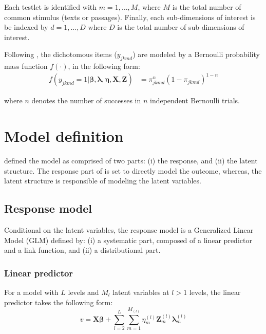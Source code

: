 Each testlet is identified with $m=1, \dots, M$, where $M$ is the total number of common stimulus (texts or passages). Finally, each sub-dimensions of interest is be indexed by $d=1, \dots, D$ where $D$ is the total number of sub-dimensions of interest. 

Following \citet{Rabe_et_al_2004a, Rabe_et_al_2004b}, the dichotomous items ($y_{jkmd}$) are modeled by a Bernoulli probability mass function $f(\cdot)$, in the following form:
\begin{equation} \label{eq:outcome}
	\begin{split}
		f \left( y_{jkmd}=1 | \pmb{\beta}, \pmb{\lambda}, \pmb{\eta}, \mathbf{X}, \mathbf{Z} \right) &= \pi_{jkmd}^{n} (1-\pi_{jkmd})^{1-n}
	\end{split}
\end{equation}

\noindent where $n$ denotes the number of successes in $n$ independent Bernoulli trials.

\section{Model definition} \label{sect:definition}

defined the model as comprised of two parts: (i) the response, and (ii) the latent structure. The response part of is set to directly model the outcome, whereas, the latent structure is responsible of modeling the latent variables.




\subsection{Response model} \label{s_sect:response}

Conditional on the latent variables, the response model is a Generalized Linear Model (GLM) \cite{Nelder_et_al_1989} defined by: (i) a systematic part, composed of a linear predictor and a link function, and (ii) a distributional part. 

\subsubsection{Linear predictor} \label{ss_sect:linear_predictor}
For a model with $L$ levels and $M_{l}$ latent variables at $l>1$ levels, the linear predictor takes the following form:
\begin{equation} \label{eq:linear_predictor}
	v = \mathbf{X} \pmb{\beta} + \sum_{l=2}^{L} \sum_{m=1}^{M_{(l)}} \eta_{m}^{(l)} \mathbf{Z}_{m}^{(l)} \pmb{\lambda}_{m}^{(l)}
\end{equation}

